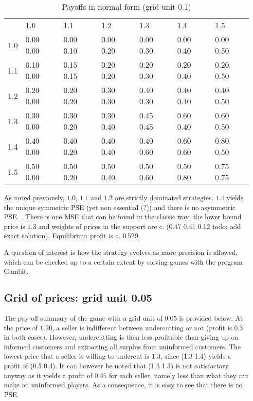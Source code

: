 \documentclass[11pt]{article}
\begin{document}
\begin{table}[h]
\caption{Payoffs in normal form (grid unit 0.1)}
\begin{singlespace}
\begin{tabular}{lllllll}
   {}   & 1.0       & 1.1       & 1.2       & 1.3       & 1.4       & 1.5       \\
   1.0  & 0.00 0.00 & 0.00 0.10 & 0.00 0.20 & 0.00 0.30 & 0.00 0.40 & 0.00 0.50 \\
   1.1  & 0.10 0.00 & 0.15 0.15 & 0.20 0.20 & 0.20 0.30 & 0.20 0.40 & 0.20 0.50 \\
   1.2  & 0.20 0.00 & 0.20 0.20 & 0.30 0.30 & 0.40 0.30 & 0.40 0.40 & 0.40 0.50 \\
   1.3  & 0.30 0.00 & 0.30 0.20 & 0.30 0.40 & 0.45 0.45 & 0.60 0.40 & 0.60 0.50 \\
   1.4  & 0.40 0.00 & 0.40 0.20 & 0.40 0.40 & 0.40 0.60 & 0.60 0.60 & 0.80 0.50 \\
   1.5  & 0.50 0.00 & 0.50 0.20 & 0.50 0.40 & 0.50 0.60 & 0.50 0.80 & 0.75 0.75 \\
\end{tabular}
\end{singlespace}
\end{table}

As noted previously, $1.0$, $1.1$ and $1.2$ are strictly dominated strategies. $1.4$ yields the unique symmetric PSE (yet non essential (?)) and there is no asymmetric PSE. . There is one MSE that can be found in the classic way: the lower bound price is $1.3$ and weights of prices in the support are c. (0.47 0.41 0.12 todo: add exact solution). Equilibrium profit is c. 0.529.

A question of interest is how the strategy evolves as more precision is allowed, which can be checked up to a certain extent by solving games with the program Gambit.

\subsection{Grid of prices: grid unit 0.05}

The pay-off summary of the game with a grid unit of 0.05 is provided below. At the price of $1.20$, a seller is indifferent between undercutting or not (profit is $0.3$ in both cases). However, undercutting is then less profitable than giving up on informed customers and extracting all surplus from uninformed customers. The lowest price that a seller is willing to undercut is $1.3$, since (1.3 1.4) yields a profit of (0.5 0.4). It can however be noted that (1.3 1.3) is not satisfactory anyway as it yields a profit of $0.45$ for each seller, namely less than what they can make on uninformed players. As a consequence, it is easy to see that there is no PSE.
\end{document}
